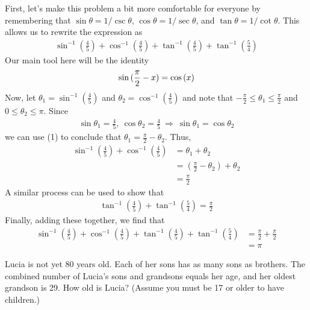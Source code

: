 \documentclass[12pt]{article}
\newcounter{problem}
\begin{document}
\begin{solution}[B]
   First, let's make this problem a bit more comfortable for everyone by remembering that $\sin{\theta}=1/\csc{\theta}$, $\cos{\theta}=1/\sec{\theta}$, and $\tan{\theta}=1/\cot{\theta}$. This allows us to rewrite the expression as 
   \begin{align*}
      \sin^{-1}{\left(\frac{4}{5}\right)}+\cos^{-1}{\left(\frac{4}{5}\right)}+\tan^{-1}{\left(\frac{4}{5}\right)}+\tan^{-1}{\left(\frac{5}{4}\right)}
   \end{align*}
   Our main tool here will be the identity
   \begin{align} \setcounter{equation}{0}
      \sin{(\frac{\pi}{2}-x)}=\cos{(x)}
   \end{align}
   Now, let $\theta_1 = \sin^{-1}{\left(\frac{4}{5}\right)}$ and $\theta_2 = \cos^{-1}{\left(\frac{4}{5}\right)}$ and note that $-\frac{\pi}{2} \leq \theta_1 \leq \frac{\pi}{2}$ and $0 \leq \theta_2 \leq \pi$.
   Since
   \begin{align*}
      \sin{\theta_1} = \frac{4}{5}, \: \cos{\theta_2} = \frac{4}{5} \: \Rightarrow \: \sin{\theta_1} = \cos{\theta_2}
   \end{align*}
   we can use (1) to conclude that $\theta_1 = \frac{\pi}{2} - \theta_2$. Thus,
   \begin{align*}
      \sin^{-1}{\left(\frac{4}{5}\right)}+\cos^{-1}{\left(\frac{4}{5}\right)} &= \theta_1 + \theta_2 \\
      &= (\frac{\pi}{2} - \theta_2) + \theta_2 \\
      &= \frac{\pi}{2}
   \end{align*}
   A similar process can be used to show that 
   \begin{align*}
      \tan^{-1}{\left(\frac{4}{5}\right)}+\tan^{-1}{\left(\frac{5}{4}\right)} = \frac{\pi}{2}
   \end{align*}
   Finally, adding these together, we find that 
   \begin{align*}
      \sin^{-1}{\left(\frac{4}{5}\right)}+\cos^{-1}{\left(\frac{4}{5}\right)}+\tan^{-1}{\left(\frac{4}{5}\right)}+\tan^{-1}{\left(\frac{5}{4}\right)} &= \frac{\pi}{2} + \frac{\pi}{2} \\
      &= \boxed{\pi}
\end{align*}
\end{solution}

\newpage

\begin{problem}
   Lucia is not yet 80 years old. Each of her sons has as many sons as brothers. The combined number of Lucia’s sons and grandsons equals her age, and her oldest grandson is 29. How old is Lucia? (Assume you must be 17 or older to have children.) 
    
\end{problem}
\end{document}
